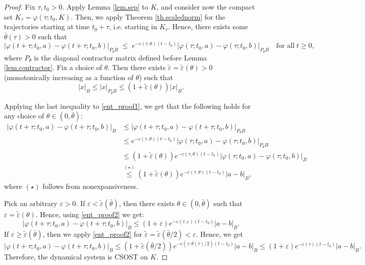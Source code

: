 \documentclass[10pt,a4paper]{amsart}
\newcommand{\tl}{\tilde}
\begin{document}
\begin{proof}
	Fix $\tau,t_0>0$. %
	  Apply Lemma \ref{lem.sep}  to $K$, and  consider now the compact set $K_\tau=\varphi(\tau;t_0,K)$. Then, we apply Theorem \ref{th.scalednorm} for the trajectories starting at time $t_0+\tau$, i.e. starting in $K_\tau$. Hence, there exists some $\bar\theta(\tau)>0$ such that
	\begin{equation}\label{ent_proof1}
		|\varphi(t+\tau;t_0,a)-\varphi(t+\tau;t_0,b)|_{P_\theta B} \;\leq\; e^{-c(\tau,\theta) (t-t_0)}|\varphi(\tau;t_0,a)-\varphi(\tau;t_0,b)|_{P_\theta B} \quad \mbox{for all}\; t\geq0,
	\end{equation}
	where $P_\theta$ is  the diagonal contractor matrix defined before Lemma \ref{lem.contractor}.  Fix a choice of $\theta$. Then there exists $\tl\varepsilon=\tilde\varepsilon(\theta)>0$ (monotonically increasing as a function of  $\theta$) such that
	\[ |x|_B \le |x|_{P_\theta B} \le (1+\tilde\varepsilon(\theta) ) |x|_B.\]
	
	Applying the last inequality to \eqref{ent_proof1}, we get that the following holds for any choice of $\theta \in (0,\bar\theta)$:
	\begin{align}\nonumber |\varphi(t+\tau;t_0,a)-\varphi(t+\tau;t_0,b)|_{B} &\le |\varphi(t+\tau;t_0,a)-\varphi(t+\tau;t_0,b)|_{P_\theta B}  \\ \nonumber & \le  e^{-c(\tau,\theta) (t-t_0)}|\varphi(\tau;t_0,a)-\varphi(\tau;t_0,b)|_{P_\theta B} \\ \nonumber & \le (1+\tilde\varepsilon(\theta) ) e^{-c(\tau,\theta) (t-t_0)}|\varphi(\tau;t_0,a)-\varphi(\tau;t_0,b)|_{B} \\ \label{ent_proof2} & \mathop{\le}\limits^{(\star)}(1+\tilde\varepsilon(\theta) ) e^{-c(\tau,\theta) (t-t_0)}|a-b|_{B}, \end{align}
	where $(\star)$ follows from nonexpansiveness. 
	
	Pick an arbitrary $\varepsilon>0$. If $\varepsilon<\tilde\varepsilon{({\bar\theta})}$, then there exists $\theta \in (0,\bar\theta)$ such that $\varepsilon=\tilde\varepsilon(\theta)$. Hence, using \eqref{ent_proof2} we get:
	\begin{equation*} |\varphi(t+\tau;t_0,a)-\varphi(t+\tau;t_0,b)|_{B}  \le (1+\varepsilon ) e^{-c(\tau,\varepsilon)(t-t_0)}|a-b|_{B}.  \end{equation*}
	If $\varepsilon\ge\tilde\varepsilon(\bar\theta)$, then we apply \eqref{ent_proof2} for $\tl\varepsilon= \tl\varepsilon({\bar\theta/2})<\varepsilon$. Hence, we get
	\begin{equation*} |\varphi(t+\tau;t_0,a)-\varphi(t+\tau;t_0,b)|_{B}  \le (1+\tilde\varepsilon({\bar\theta/2}) )   e^{-c(\tau,\bar\theta(\tau)/2) (t-t_0)}|a-b|_{B} \le  (1+\varepsilon ) e^{-c(\tau)(t-t_0)}|a-b|_{B}.  \end{equation*}
	Therefore, the dynamical system is CSOST on $K$.
\end{proof}
\end{document}
